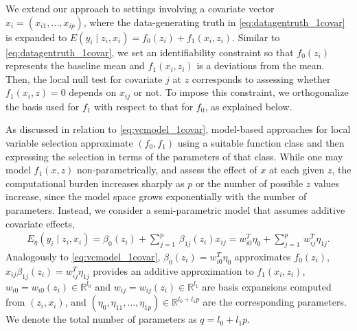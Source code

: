 We extend our approach to settings involving a covariate vector $x_i = (x_{i1},\ldots,x_{ip})$, where the data-generating truth in \eqref{eq:datagentruth_1covar} is expanded to
$E(y_i \mid z_i, x_i) = f_0(z_i) + f_1(x_i, z_i)$.
Similar to \eqref{eq:datagentruth_1covar}, we set an identifiability constraint so that $f_0(z_i)$ represents the baseline mean and $f_1(x_i,z_i)$ is a deviations from the mean. Then,  the local null test for covariate $j$ at $z$ corresponds to assessing whether $f_1(x_i,z)=0$ depends on $x_{ij}$ or not. To impose this constraint, we orthogonalize the basis used for $f_1$ with respect to that for $f_0$, as explained below.

As discussed in relation to \eqref{eq:vcmodel_1covar}, model-based approaches for local variable selection approximate $(f_0,f_1)$ using a suitable function class and then expressing the selection in terms of the parameters of that class. While one may model $f_1(x,z)$ non-parametrically, and assess the effect of $x$ at each given $z$, the computational burden increases sharply as $p$ or the number of possible $z$ values increase, since the model space grows exponentially with the number of parameters. Instead, we consider a semi-parametric model that assumes additive covariate effects,
\begin{align}
 E_{\eta}(y_i \mid z_i, x_i)= \beta_0(z_i) + \sum_{j=1}^p \, \beta_{1j}(z_i) x_{ij}= w_{i0}^T \eta_0 + \sum_{j=1}^p \, w_{ij}^T \eta_{1j}.
\label{eq:vcmodel_additive}
\end{align}
Analogously to \eqref{eq:vcmodel_1covar}, $\beta_0(z_i)= w_{i0}^T \eta_0$ approximates $f_0(z_i)$,
$x_{ij} \beta_{1j}(z_i)= w_{ij}^T \eta_{1j}$ provides an additive approximation to $f_1(x_i,z_i)$,
$w_{i0}=w_{i0}(z_i) \in \mathbb{R}^{l_0}$ and $w_{ij}=w_{ij}(z_i) \in \mathbb{R}^{l_1}$ are basis expansions computed from $(z_i,x_i)$,
 and $(\eta_0,\eta_{11},\ldots,\eta_{1p}) \in \mathbb{R}^{l_0 + l_1 p}$ are the corresponding parameters.
We denote the total number of parameters as $q= l_0 + l_1p$.

